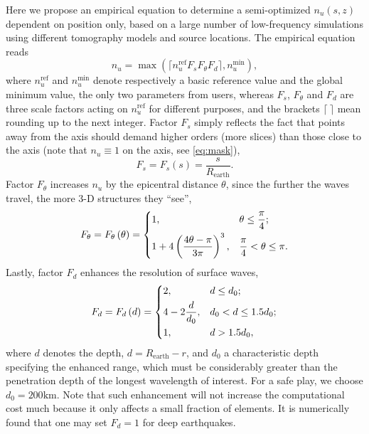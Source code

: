 \documentclass[extra]{gji}
\begin{document}
Here we propose an empirical equation to determine 
a semi-optimized $n_u\left(s,z\right)$ dependent on position only, based on
a large number of low-frequency simulations using different tomography 
models and source locations. The empirical equation reads
\begin{equation}
  n_u=\max\left(\lceil n_u^\text{ref} F_s F_\theta F_d\rceil, n_u^\text{min}\right),
  \label{eq:nu}
\end{equation}
where $n_u^\text{ref}$ and $n_u^\text{min}$ denote respectively 
a basic reference value and the global minimum value, the only
two parameters from users, whereas $F_s$, $F_\theta$ and $F_d$
are three scale factors acting on $n_u^\text{ref}$ 
for different purposes, and the brackets $\lceil\ \rceil$ mean rounding 
up to the next integer.
Factor $F_s$ simply reflects the fact that points away from the axis 
should demand higher orders (more slices) than those close to the axis 
(note that $n_u\equiv 1$ on the axis, see \eqref{eq:mask}),  
\begin{equation}
  F_s=F_s\left(s\right)=\frac{s}{R_\text{earth}}.
  \label{eq:fs}
\end{equation}
Factor $F_\theta$ increases $n_u$ by the epicentral distance $\theta$,
since the further the waves travel, the more 3-D structures they ``see'',
\begin{equation}
  F_\theta=F_\theta\left(\theta\right)=
  \begin{dcases}
    1,&\theta\le\frac{\pi}{4};\\
    1+4\left(\frac{4\theta-\pi}{3\pi}\right)^3,&
    \frac{\pi}{4}<\theta\le\pi.
  \end{dcases}
  \label{eq:ft}
\end{equation}
Lastly, factor $F_d$ enhances the resolution of surface waves, 
\begin{equation}
  F_d=F_d\left(d\right)=
  \begin{dcases}
    2, & d \le d_{0}; \\
    4-2\frac{d}{d_{0}}, 
    &d_{0}<d\le1.5d_{0};\\
    1,& d > 1.5 d_{0},
  \end{dcases}
  \label{eq:fd}
\end{equation}
where $d$ denotes the depth, $d=R_\text{earth}-r$,
and $d_{0}$ a characteristic depth specifying 
the enhanced range, which must be considerably
greater than the penetration depth of the longest wavelength 
of interest. For a safe play, we choose $d_{0}=200\text{km}$.
Note that such enhancement will not increase the computational
cost much because it only affects a small fraction of elements. 
It is numerically found that one may set $F_d=1$ for deep 
earthquakes.
\end{document}
